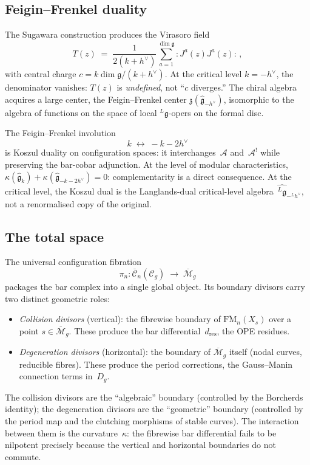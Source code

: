 \documentclass[11pt]{report}
\theoremstyle{definition}
\theoremstyle{remark}
\providecommand{\cA}{\mathcal{A}}
\numberwithin{equation}{section}
\begin{document}
\subsection*{Feigin--Frenkel duality}

The Sugawara construction produces the Virasoro field
\[
T(z)
\;=\;
\frac{1}{2(k+h^\vee)}\sum_{a=1}^{\dim\mathfrak g}
{:}J^a(z)J^a(z){:}\,,
\]
with central charge $c=k\dim\mathfrak g/(k+h^\vee)$. At the
critical level $k=-h^\vee$, the denominator vanishes: $T(z)$ is
\emph{undefined}, not ``$c$ diverges.'' The chiral algebra
acquires a large center, the Feigin--Frenkel center
$\mathfrak z(\widehat{\mathfrak g}_{-h^\vee})$, isomorphic to the
algebra of functions on the space of local ${}^L\mathfrak g$-opers
on the formal disc.

The Feigin--Frenkel involution
\[
k\;\longleftrightarrow\;-k-2h^\vee
\]
is Koszul duality on configuration spaces: it interchanges~$\cA$
and~$\cA^!$ while preserving the bar-cobar adjunction. At the
level of modular characteristics,
$\kappa(\widehat{\mathfrak g}_k)+
\kappa(\widehat{\mathfrak g}_{-k-2h^\vee})=0$:
complementarity is a direct consequence. At the critical
level, the Koszul dual is the Langlands-dual critical-level
algebra~$\widehat{{}^L\mathfrak g}_{-{}^Lh^\vee}$, not a
renormalised copy of the original.

\subsection*{The total space}

The universal configuration fibration
\[
\pi_n\colon
\overline{\mathcal C}_n(\mathcal C_g)
\;\longrightarrow\;
\overline{\mathcal M}_g
\]
packages the bar complex into a single global object. Its boundary
divisors carry two distinct geometric roles:
\begin{itemize}
\item \emph{Collision divisors} (vertical): the fibrewise boundary
of $\overline{\mathrm{FM}}_n(X_s)$ over a point
$s\in\overline{\mathcal M}_g$. These produce the bar
differential~$d_{\mathrm{res}}$, the OPE residues.
\item \emph{Degeneration divisors} (horizontal): the boundary of
$\overline{\mathcal M}_g$ itself (nodal curves, reducible
fibres). These produce the period corrections, the
Gauss--Manin connection terms in~$D_g$.
\end{itemize}
The collision divisors are the ``algebraic'' boundary (controlled by
the Borcherds identity); the degeneration divisors are the
``geometric'' boundary (controlled by the period map and the
clutching morphisms of stable curves). The interaction between them
is the curvature~$\kappa$: the fibrewise bar differential fails to
be nilpotent precisely because the vertical and horizontal
boundaries do not commute.
\end{document}
